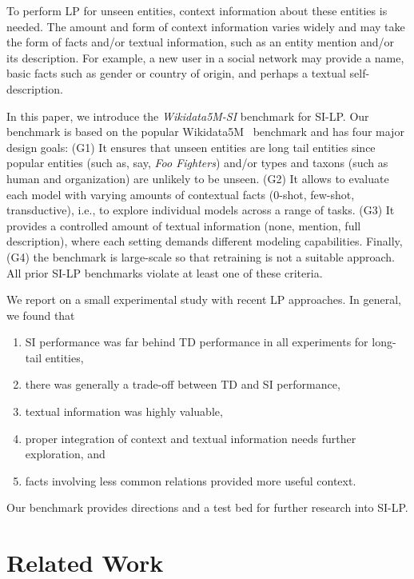 \documentclass[11pt]{article}
\renewcommand\:{\colon} \newcommand{\sset}[1]{\left\{\,#1\,\right\}} \newcommand{\ssets}[1]{\left\{#1\right\}} \newcommand{\ssetn}[1]{\{\,#1\,\}}
\begin{document}
To perform LP for unseen entities, context information about these entities is needed.
The amount and form of context information varies widely and may take the form
of facts and/or textual information, such as an entity mention and/or its
description. For example, a new user in a social network may provide a name,
basic facts such as gender or country of origin, and perhaps a textual
self-description.



In this paper, we introduce the \emph{Wikidata5M-SI} benchmark for SI-LP. Our
benchmark is based on the popular Wikidata5M~\cite{wang2021KEPLER} benchmark and
has four major design goals: (G1) It ensures that unseen entities are long tail
entities since popular entities (such as, say, \emph{Foo Fighters}) and/or types
and taxons (such as human and organization) are unlikely to be unseen. (G2) It
allows to evaluate each model with varying amounts of contextual facts (0-shot,
few-shot, transductive), i.e., to explore individual models across a range of
tasks. (G3) It provides a controlled amount of textual information (none,
mention, full description), where each setting demands different modeling
capabilities. Finally, (G4) the benchmark is large-scale so that retraining is
not a suitable approach. All prior SI-LP benchmarks violate at least one of
these criteria.


We report on a small experimental study with recent LP approaches.
In general, we found that
\begin{enumerate}[itemsep=0em]
  \item SI performance was far behind TD performance in all experiments for long-tail entities,
  \item there was generally a trade-off between TD and SI performance,
  \item textual information was highly valuable,
  \item proper integration of context and textual information needs further exploration, and
  \item facts involving less common relations provided more useful context.
\end{enumerate}
Our benchmark provides directions and a test bed for further research into SI-LP.


\section{Related Work}
\label{sec:related_work}
\end{document}
